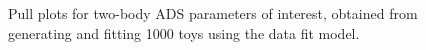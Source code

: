 \begin{figure}
\begin{tabular}{c}
  \end{tabular}
  \caption{Pull plots for two-body ADS parameters of interest, obtained from generating and fitting 1000 toys using the data fit model.}
\label{fig:twoBody_ADS_pulls}
\end{figure}
